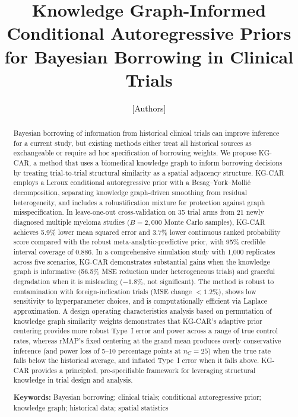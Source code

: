 \documentclass[12pt]{article}
\title{Knowledge Graph-Informed Conditional Autoregressive Priors \\
for Bayesian Borrowing in Clinical Trials}
\author{
  [Authors]
}
\date{}
\begin{document}
\maketitle

\begin{abstract}
Bayesian borrowing of information from historical clinical trials can improve inference for a current study, but existing methods either treat all historical sources as exchangeable or require ad hoc specification of borrowing weights. We propose KG-CAR, a method that uses a biomedical knowledge graph to inform borrowing decisions by treating trial-to-trial structural similarity as a spatial adjacency structure. KG-CAR employs a Leroux conditional autoregressive prior with a Besag--York--Molli\'{e} decomposition, separating knowledge graph-driven smoothing from residual heterogeneity, and includes a robustification mixture for protection against graph misspecification. In leave-one-out cross-validation on 35 trial arms from 21 newly diagnosed multiple myeloma studies ($B = 2{,}000$ Monte Carlo samples), KG-CAR achieves 5.9\% lower mean squared error and 3.7\% lower continuous ranked probability score compared with the robust meta-analytic-predictive prior, with 95\% credible interval coverage of 0.886. In a comprehensive simulation study with 1{,}000 replicates across five scenarios, KG-CAR demonstrates substantial gains when the knowledge graph is informative (56.5\% MSE reduction under heterogeneous trials) and graceful degradation when it is misleading ($-1.8\%$, not significant). The method is robust to contamination with foreign-indication trials (MSE change $< 1.2\%$), shows low sensitivity to hyperparameter choices, and is computationally efficient via Laplace approximation. A design operating characteristics analysis based on permutation of knowledge graph similarity weights demonstrates that KG-CAR's adaptive prior centering provides more robust Type~I error and power across a range of true control rates, whereas rMAP's fixed centering at the grand mean produces overly conservative inference (and power loss of 5--10 percentage points at $n_C = 25$) when the true rate falls below the historical average, and inflated Type~I error when it falls above. KG-CAR provides a principled, pre-specifiable framework for leveraging structural knowledge in trial design and analysis.

\vspace{6pt}
\noindent \textbf{Keywords:} Bayesian borrowing; clinical trials; conditional autoregressive prior; knowledge graph; historical data; spatial statistics
\end{abstract}
\end{document}
